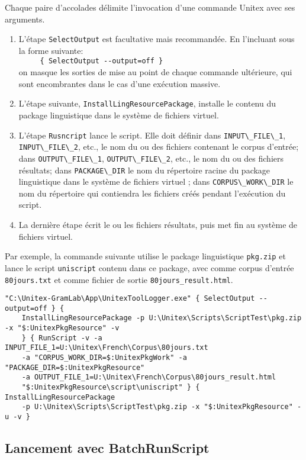 \noindent Chaque paire d'accolades délimite l'invocation d'une commande Unitex avec ses arguments.

\begin{enumerate}
\item L'étape \verb$SelectOutput$ est facultative mais recommandée. En l'incluant sous la forme
suivante:\\
\verb$     { SelectOutput --output=off }$\\
on masque les sorties de mise au point de chaque commande ultérieure, qui sont encombrantes
dans le cas d'une exécution massive.
\item L'étape suivante, \verb$InstallLingResourcePackage$, installe le contenu du package linguistique
dans le système de fichiers virtuel.
\item L'étape \verb$Rusncript$ lance le script. Elle doit définir dans  \verb$INPUT\_FILE\_1$,
\verb$INPUT\_FILE\_2$, etc., le nom du ou des fichiers contenant le corpus d'entrée; dans
\verb$OUTPUT\_FILE\_1$, \verb$OUTPUT\_FILE\_2$, etc., le nom du ou des fichiers résultats;
dans \verb$PACKAGE\_DIR$ le nom du répertoire racine du package linguistique dans le système
de fichiers virtuel ; dans \verb$CORPUS\_WORK\_DIR$ le nom du répertoire qui contiendra les fichiers
créés pendant l'exécution du script.
\item La dernière étape écrit le ou les fichiers résultats, puis met fin au système de fichiers virtuel.
\end{enumerate}

\noindent Par exemple, la commande suivante utilise le package linguistique \verb$pkg.zip$ et lance
le script \verb$uniscript$ contenu dans ce package, avec comme corpus d'entrée \verb$80jours.txt$
et comme fichier de sortie \verb$80jours_result.html$.

\begin{Verbatim}[fontsize=\small,fontfamily=helvetica]
"C:\Unitex-GramLab\App\UnitexToolLogger.exe" { SelectOutput --output=off } {
    InstallLingResourcePackage -p U:\Unitex\Scripts\ScriptTest\pkg.zip -x "$:UnitexPkgResource" -v
    } { RunScript -v -a INPUT_FILE_1=U:\Unitex\French\Corpus\80jours.txt 
    -a "CORPUS_WORK_DIR=$:UnitexPkgWork" -a "PACKAGE_DIR=$:UnitexPkgResource"
    -a OUTPUT_FILE_1=U:\Unitex\French\Corpus\80jours_result.html 
    "$:UnitexPkgResource\script\uniscript" } { InstallLingResourcePackage
    -p U:\Unitex\Scripts\ScriptTest\pkg.zip -x "$:UnitexPkgResource" -u -v }
\end{Verbatim}

\subsection{Lancement avec BatchRunScript}


